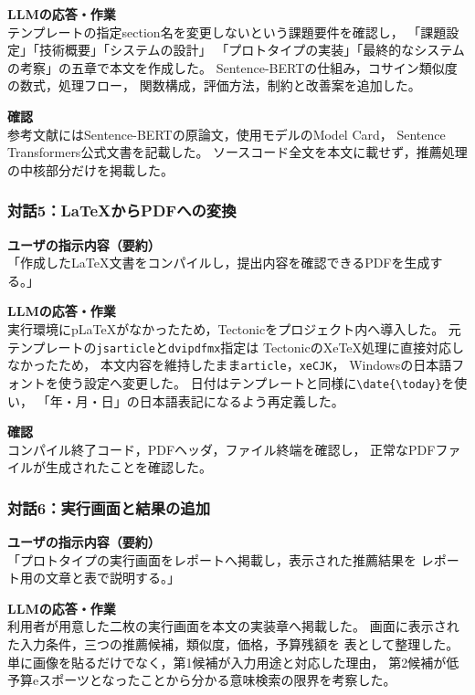 \documentclass[a4paper,11pt]{article}
\renewcommand{\today}{\number\year 年\number\month 月\number\day 日}
\begin{document}
\noindent
\textbf{LLMの応答・作業}\\
テンプレートの指定section名を変更しないという課題要件を確認し，
「課題設定」「技術概要」「システムの設計」
「プロトタイプの実装」「最終的なシステムの考察」の五章で本文を作成した。
Sentence-BERTの仕組み，コサイン類似度の数式，処理フロー，
関数構成，評価方法，制約と改善案を追加した。

\noindent
\textbf{確認}\\
参考文献にはSentence-BERTの原論文，使用モデルのModel Card，
Sentence Transformers公式文書を記載した。
ソースコード全文を本文に載せず，推薦処理の中核部分だけを掲載した。

\subsubsection*{対話5：LaTeXからPDFへの変換}
\noindent
\textbf{ユーザの指示内容（要約）}\\
「作成したLaTeX文書をコンパイルし，提出内容を確認できるPDFを生成する。」

\noindent
\textbf{LLMの応答・作業}\\
実行環境にpLaTeXがなかったため，Tectonicをプロジェクト内へ導入した。
元テンプレートの\verb|jsarticle|と\verb|dvipdfmx|指定は
TectonicのXeTeX処理に直接対応しなかったため，
本文内容を維持したまま\verb|article|，\verb|xeCJK|，
Windowsの日本語フォントを使う設定へ変更した。
日付はテンプレートと同様に\verb|\date{\today}|を使い，
「年・月・日」の日本語表記になるよう再定義した。

\noindent
\textbf{確認}\\
コンパイル終了コード，PDFヘッダ，ファイル終端を確認し，
正常なPDFファイルが生成されたことを確認した。

\subsubsection*{対話6：実行画面と結果の追加}
\noindent
\textbf{ユーザの指示内容（要約）}\\
「プロトタイプの実行画面をレポートへ掲載し，表示された推薦結果を
レポート用の文章と表で説明する。」

\noindent
\textbf{LLMの応答・作業}\\
利用者が用意した二枚の実行画面を本文の実装章へ掲載した。
画面に表示された入力条件，三つの推薦候補，類似度，価格，予算残額を
表として整理した。
単に画像を貼るだけでなく，第1候補が入力用途と対応した理由，
第2候補が低予算eスポーツとなったことから分かる意味検索の限界を考察した。
\end{document}
